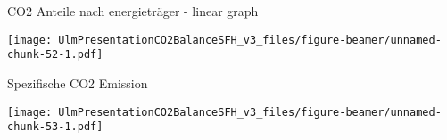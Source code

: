 \documentclass[ignorenonframetext,]{beamer}
\begin{document}
\begin{frame}{CO2 Anteile nach energieträger - linear graph}

\texttt{[image: UlmPresentationCO2BalanceSFH\_v3\_files/figure-beamer/unnamed-chunk-52-1.pdf]}

\end{frame}

\begin{frame}{Spezifische CO2 Emission}

\texttt{[image: UlmPresentationCO2BalanceSFH\_v3\_files/figure-beamer/unnamed-chunk-53-1.pdf]}

\end{frame}
\end{document}
